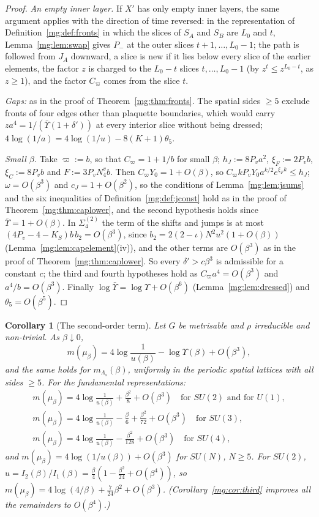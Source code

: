 \documentclass[11pt,a4paper]{article}
\newtheorem{corollary}[theorem]{Corollary}
\theoremstyle{definition}
\theoremstyle{remark}
\begin{document}
\begin{proof}
\emph{An empty inner layer.} If $X'$ has only empty inner layers, the same argument applies with the direction of time reversed: in the
representation of Definition~\ref{mg:def:fronts} in which the slices of $S_A$ and $S_B$ are $L_0$ and $t$, Lemma~\ref{mg:lem:swap} gives $P_-$ at the outer
slices $t+1,\dots,L_0-1$; the path is followed from $J_A$ downward, a slice is new if it lies below every slice of the earlier elements, the factor $z$ is
charged to the $L_0-t$ slices $t,\dots,L_0-1$ (by $z^t\le z^{L_0-t}$, as $z\ge1$), and the factor $C_\varpi$ comes from the slice $t$.

\emph{Gaps:} as in the proof of Theorem~\ref{mg:thm:fronts}. The spatial sides $\ge5$ exclude fronts of four edges other than plaquette boundaries,
which would carry $za^4=1/(\bar\Upsilon(1+\delta'))$ at every interior slice without being dressed; $4\log(1/a)=4\log(1/u)-8(K+1)\theta_5$.

\emph{Small $\beta$.} Take $\varpi:=b$, so that $C_\varpi=1+1/b$ for small $\beta$; $h_J:=8P_va^2$, $\xi_F:=2P_vb$, $\xi_C:=8P_vb$ and $F:=3P_vN^v_4b$. Then
$C_\varpi Y_0=1+O(\beta)$, so $C_\varpi kP_vY_0a^{k/2}e^{\xi_Fk}\le h_J$; $\omega=O(\beta^3)$ and $c_J=1+O(\beta^2)$, so the conditions of Lemma~\ref{mg:lem:jsums} and
the six inequalities of Definition~\ref{mg:def:jconst} hold as in the proof of Theorem~\ref{mg:thm:caplower}, and the second hypothesis holds since
$\bar\Upsilon=1+O(\beta)$. In $\Sigma^{(2)}_4$ the term of the shifts and jumps is at most $(4P_v-4-K_S)b\,b_2=O(\beta^3)$, since $b_2=2(2-\iota)N^2u^2(1+O(\beta))$
(Lemma~\ref{mg:lem:capelement}(iv)), and the other terms are $O(\beta^3)$ as in the proof of Theorem~\ref{mg:thm:caplower}. So every
$\delta'>c\beta^3$ is admissible for a constant $c$; the third and fourth hypotheses hold as $C_\varpi a^4=O(\beta^3)$ and $a^4/b=O(\beta^3)$. Finally
$\log\bar\Upsilon=\log\Upsilon+O(\beta^6)$ (Lemma~\ref{mg:lem:dressed}) and $\theta_5=O(\beta^5)$.
\end{proof}

\begin{corollary}[The second-order term]\label{mg:cor:second}
Let $G$ be metrisable and $\rho$ irreducible and non-trivial. As $\beta\downarrow0$,
\[
m(\mu_\beta)=4\log\frac1{u(\beta)}-\log\Upsilon(\beta)+O(\beta^3),
\]
and the same holds for $m_{\Lambda_s}(\beta)$, uniformly in the periodic spatial lattices with all sides $\ge5$. For the fundamental representations:
\begin{gather*}
m(\mu_\beta)=4\log\frac1{u(\beta)}+\frac{\beta^2}8+O(\beta^3)\quad\text{for $SU(2)$ and for $U(1)$},\\
m(\mu_\beta)=4\log\frac1{u(\beta)}-\frac\beta6+\frac{\beta^2}{72}+O(\beta^3)\quad\text{for $SU(3)$},\\
m(\mu_\beta)=4\log\frac1{u(\beta)}-\frac{\beta^2}{128}+O(\beta^3)\quad\text{for $SU(4)$},
\end{gather*}
and $m(\mu_\beta)=4\log(1/u(\beta))+O(\beta^3)$ for $SU(N)$, $N\ge5$. For $SU(2)$, $u=I_2(\beta)/I_1(\beta)=\frac\beta4(1-\frac{\beta^2}{24}+O(\beta^4))$, so
$m(\mu_\beta)=4\log(4/\beta)+\frac7{24}\beta^2+O(\beta^3)$. (Corollary~\ref{mg:cor:third} improves all the remainders to $O(\beta^4)$.)
\end{corollary}
\end{document}

